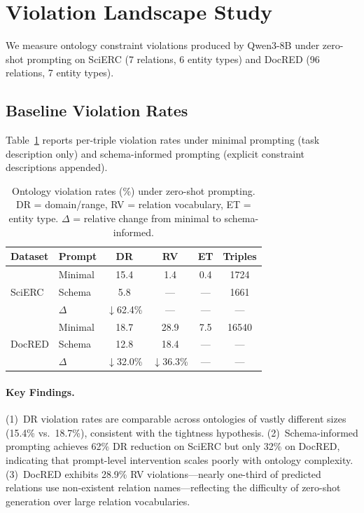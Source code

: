 \documentclass[11pt,a4paper]{article}
\newcommand{\drarrow}[1]{\textcolor{green!60!black}{$\downarrow$#1\%}}
\begin{document}
\section{Violation Landscape Study}
\label{sec:landscape}

We measure ontology constraint violations produced by Qwen3-8B under zero-shot prompting on SciERC (7 relations, 6 entity types) and DocRED (96 relations, 7 entity types).

\subsection{Baseline Violation Rates}

Table~\ref{tab:landscape} reports per-triple violation rates under minimal prompting (task description only) and schema-informed prompting (explicit constraint descriptions appended).

\begin{table}[t]
\centering
\small
\caption{Ontology violation rates (\%) under zero-shot prompting. DR = domain/range, RV = relation vocabulary, ET = entity type. $\Delta$ = relative change from minimal to schema-informed.}
\label{tab:landscape}
\begin{tabular}{llcccc}
\toprule
\textbf{Dataset} & \textbf{Prompt} & \textbf{DR} & \textbf{RV} & \textbf{ET} & \textbf{Triples} \\
\midrule
\multirow{3}{*}{SciERC} & Minimal & 15.4 & 1.4 & 0.4 & 1724 \\
                        & Schema  & 5.8  & --- & --- & 1661 \\
                        & $\Delta$ & \drarrow{62.4} & --- & --- & --- \\
\midrule
\multirow{3}{*}{DocRED} & Minimal & 18.7 & 28.9 & 7.5 & 16540 \\
                        & Schema  & 12.8 & 18.4 & --- & --- \\
                        & $\Delta$ & \drarrow{32.0} & \drarrow{36.3} & --- & --- \\
\bottomrule
\end{tabular}
\end{table}

\paragraph{Key Findings.}
(1)~DR violation rates are comparable across ontologies of vastly different sizes (15.4\% vs.\ 18.7\%), consistent with the tightness hypothesis.
(2)~Schema-informed prompting achieves 62\% DR reduction on SciERC but only 32\% on DocRED, indicating that prompt-level intervention scales poorly with ontology complexity.
(3)~DocRED exhibits 28.9\% RV violations---nearly one-third of predicted relations use non-existent relation names---reflecting the difficulty of zero-shot generation over large relation vocabularies.
\end{document}
